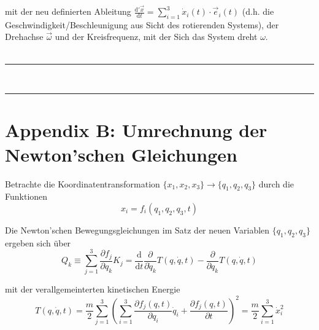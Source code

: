 \documentclass{article}
\newcommand{\diff}{\mathrm{d}}
\newcommand{\lr}[1]{\left(#1\right)}
\begin{document}
mit der neu definierten Ableitung $\frac{\diff'\vec{x}}{\diff t} = \sum_{i=1}^3 \dot{x}_i(t) \cdot \vec{e}_i(t)$ \textcolor{gruen}{(d.h. die Geschwindigkeit/Beschleunigung aus Sicht des rotierenden Systems)}, der Drehachse $\vec{\omega}$ und der Kreisfrequenz, mit der Sich das System dreht $\omega$.\\
\\
{\color{blue}
\hrule
	\\




\hrule
}


\newpage


\section*{Appendix B: Umrechnung der Newton'schen Gleichungen}
Betrachte die Koordinatentransformation $\{x_1,x_2,x_3\} \to \{q_1,q_2,q_3\}$ durch die Funktionen
	$$x_i = f_i(q_1,q_2,q_3,t)$$

Die Newton'schen Bewegungsgleichungen im Satz der neuen Variablen $\{q_1,q_2,q_3\}$ ergeben sich über
	\begin{equation}
		Q_k \equiv \sum_{j=1}^3 \frac{\partial f_j}{\partial q_k} K_j = \frac{\diff}{\diff t} \frac{\partial}{\partial \dot{q}_k} T(q,\dot{q},t) - \frac{\partial}{\partial q_k} T(q,\dot{q},t)
	\end{equation}

mit der verallgemeinterten kinetischen Energie 
	$$T(q,\dot{q},t) = \frac{m}{2}\sum_{j=1}^3 \lr{ \sum_{i=1}^3 \frac{\partial f_j(q,t)}{\partial q_i} \dot{q}_i + \frac{\partial f_j(q,t)}{\partial t}  }^2 = \frac{m}{2} \sum_{i=1}^3 \dot{x}_i^2$$

\vspace{0.5cm}
\end{document}
